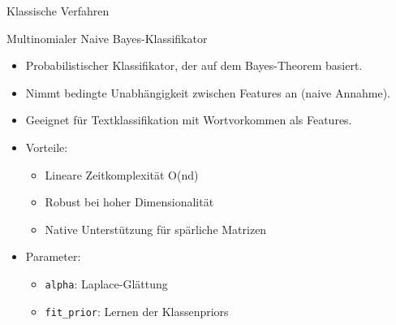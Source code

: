 \documentclass[aspectratio=169]{beamer} %
\begin{document}
\begin{frame}{Klassische Verfahren}
    \begin{block}{Multinomialer Naive Bayes-Klassifikator}
        \begin{itemize}
            \item Probabilistischer Klassifikator, der auf dem Bayes-Theorem basiert.
            \item Nimmt bedingte Unabhängigkeit zwischen Features an (naive Annahme).
            \item Geeignet für Textklassifikation mit Wortvorkommen als Features.
            \item Vorteile:
                  \begin{itemize}
                      \item Lineare Zeitkomplexität O(nd) %
                      \item Robust bei hoher Dimensionalität
                      \item Native Unterstützung für spärliche Matrizen
                  \end{itemize}
            \item Parameter:
                  \begin{itemize}
                      \item \texttt{alpha}: Laplace-Glättung
                      \item \texttt{fit\_prior}: Lernen der Klassenpriors
                  \end{itemize}
        \end{itemize}
    \end{block}
\end{frame}
\end{document}

